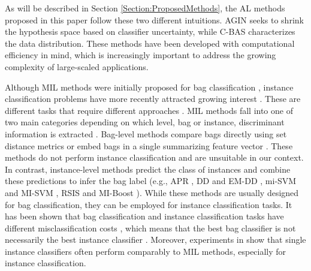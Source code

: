 \documentclass{article}
\begin{document}
As will be described in Section \ref{Section:ProposedMethods}, the AL methods proposed in this paper follow these two different intuitions. AGIN seeks to shrink the hypothesis space based on classifier uncertainty, while C-BAS characterizes the data distribution. These methods have been developed with computational efficiency in mind, which is increasingly important to address the growing complexity of large-scaled applications.

Although MIL methods were initially proposed for bag classification \cite{Amores2013}, instance classification problems have more recently attracted growing interest \cite{Xu2016Vid,Zhu2015objDisc,Vanwinckelen2015,Vezhnevets2010}. These  are different tasks that require different approaches \cite{Carbonneau2016Survey,Vanwinckelen2015}. MIL methods fall into one of two main categories depending on which level, bag or instance, discriminant information is extracted \cite{Amores2013}. Bag-level methods compare bags directly using set distance metrics or embed bags in a single summarizing feature vector \cite{Chen2006,Wang2000citation,Cheplygina2015DBE,Gartner2002,Zhou2009migraph}. These methods do not perform instance classification and are unsuitable in our context. In contrast, instance-level methods predict the class of instances and combine these predictions to infer the bag label (e.g., APR \cite{Dietterich1997}, DD and EM-DD \cite{Maron1998,Zhang2001}, mi-SVM and MI-SVM \cite{Andrews02}, RSIS \cite{Carbonneau2016RSIS} and MI-Boost \cite{Babenko2008alignement}). While these methods are usually designed for bag classification, they can be employed  for instance classification tasks. It has been shown that bag classification and instance classification tasks have different misclassification costs \cite{Carbonneau2016Survey}, which means that the best bag classifier is not necessarily the best instance classifier \cite{Vanwinckelen2015}. Moreover, experiments in \cite{Ray2005,Carbonneau2016Survey} show that single instance classifiers often perform comparably to MIL methods, especially for instance classification.
\end{document}
